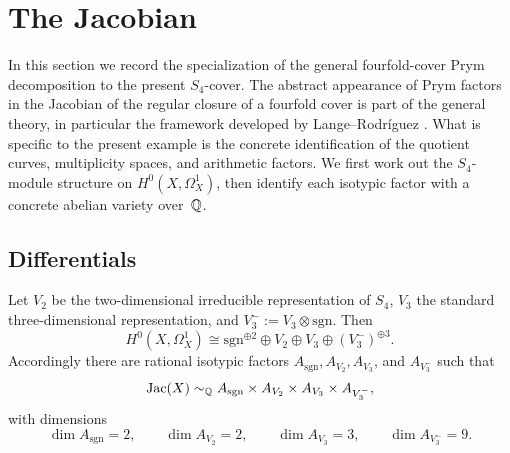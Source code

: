 \section{The Jacobian}

In this section we record the specialization of the general fourfold-cover Prym decomposition to the present \(S_4\)-cover. The abstract appearance of Prym factors in the Jacobian of the regular closure of a fourfold cover is part of the general theory, in particular the framework developed by Lange--Rodr{\'i}guez \cite[Chapter~5, Section~5.7]{LangeRodriguez2022}. What is specific to the present example is the concrete identification of the quotient curves, multiplicity spaces, and arithmetic factors. We first work out the \(S_4\)-module structure on \(H^0(X,\Omega_X^1)\), then identify each isotypic factor with a concrete abelian variety over~\(\mathbb{Q}\).

\subsection{Differentials}

\begin{theorem}\label{thm:hodge}
Let \(V_2\) be the two-dimensional irreducible representation of \(S_4\), \(V_3\) the standard three-dimensional representation, and \(V_3^-:=V_3\otimes\mathrm{sgn}\).
Then
\[
H^0(X,\Omega_X^1)\cong \mathrm{sgn}^{\oplus 2}\oplus V_2\oplus V_3\oplus (V_3^-)^{\oplus 3}.
\]
Accordingly there are rational isotypic factors \(A_{\mathrm{sgn}}, A_{V_2}, A_{V_3}\), and \(A_{V_3^-}\) such that
\[
\operatorname{Jac}(X)\sim_{\mathbb{Q}}A_{\mathrm{sgn}}\times A_{V_2}\times A_{V_3}\times A_{V_3^-},
\]
with dimensions
\[
\dim A_{\mathrm{sgn}}=2,\qquad \dim A_{V_2}=2,\qquad \dim A_{V_3}=3,\qquad \dim A_{V_3^-}=9.
\]
\end{theorem}

